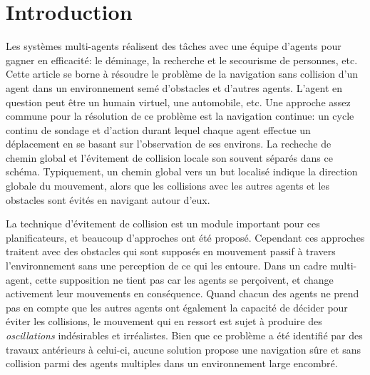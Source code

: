 \documentclass[11pt]{article}
\begin{document}
\section{Introduction}

Les systèmes multi-agents réalisent des tâches avec une équipe d'agents pour gagner en efficacité: le déminage, la recherche et le secourisme de personnes, etc. Cette article se borne à résoudre le problème de la navigation sans collision d'un agent dans un environnement semé d'obstacles et d'autres agents. L'agent en question peut être un humain virtuel, une automobile, etc. Une approche assez commune pour la résolution de ce problème est la navigation continue: un cycle continu de sondage et d'action durant lequel chaque agent effectue un déplacement en se basant sur l'observation de ses environs. La recheche de chemin global et l'évitement de collision locale son souvent séparés dans ce schéma. Typiquement, un chemin global vers un but localisé indique la direction globale du mouvement, alors que les collisions avec les autres agents et les obstacles sont évités en navigant autour d'eux.

La technique d'évitement de collision est un module important pour ces planificateurs, et beaucoup d'approches ont été proposé. Cependant ces approches traitent avec des obstacles qui sont supposés en mouvement passif à travers l'environnement sans une perception de ce qui les entoure. Dans un cadre multi-agent, cette supposition ne tient pas car les agents se perçoivent, et change activement leur mouvements en conséquence. Quand chacun des agents ne prend pas en compte que les autres agents ont également la capacité de décider pour éviter les collisions, le mouvement qui en ressort est sujet à produire des \textit{oscillations} indésirables et irréalistes. Bien que ce problème a été identifié par des travaux antérieurs à celui-ci, aucune solution propose une navigation sûre et sans collision parmi des agents multiples dans un environnement large encombré.
\end{document}
